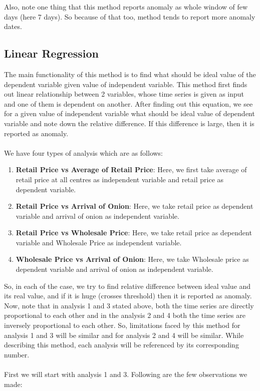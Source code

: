 	Also, note one thing that this method reports anomaly as whole window of few days (here 7 days). So because of that too, method tends to report more anomaly dates.


\subsection{Linear Regression}

		The main functionality of this method is to find what should be ideal value of the dependent variable given value of independent variable. This method first finds out linear relationship between 2 variables, whose time series is given as input and one of them is dependent on another. After finding out this equation, we see for a given value of independent variable what should be ideal value of dependent variable and note down the relative difference. If this difference is large, then it is reported as anomaly.\\
		\\
		We have four types of analysis which are as follows:
		\begin{enumerate}
			\item \textbf{Retail Price vs Average of Retail Price}: Here, we first take average of retail price at all centres as independent variable and retail price as dependent variable.			
			\item \textbf{Retail Price vs Arrival of Onion}: Here, we take retail price as dependent variable and arrival of onion as independent variable.
			\item \textbf{Retail Price vs Wholesale Price}: Here, we take retail price as dependent variable and Wholesale Price as independent variable.
			\item \textbf{Wholesale Price vs Arrival of Onion}: Here, we take Wholesale price as dependent variable and arrival of onion as independent variable.
		\end{enumerate}
		
		So, in each of the case, we try to find relative difference between ideal value and its real value, and if it is huge (crosses threshold) then it is reported as anomaly. Now, note that in analysis 1 and 3 stated above, both the time series are directly proportional to each other and in the analysis 2 and 4 both the time series are inversely proportional to each other. So, limitations faced by this method for analysis 1 and 3 will be similar and for analysis 2 and 4 will be similar. While describing this method, each analysis will be referenced by its corresponding number.\\
		\\
		First we will start with analysis 1 and 3. Following are the few observations we made:
		
